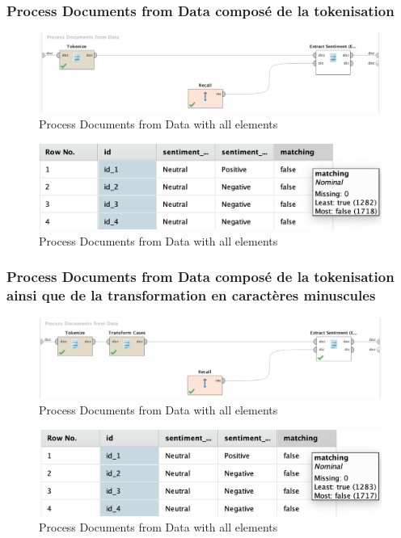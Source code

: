 \documentclass[a4paper]{article}
\begin{document}
\subsubsection{Process Documents from Data composé de la tokenisation}
\begin{figure}[H]
	\includegraphics[width=\linewidth]{imgs/part_3/3_processing_documents_no_stem_filter_token_stopword_transform}
	\caption{Process Documents from Data with all elements}
	\label{fig:3_processing_documents_full}
\end{figure}
\begin{figure}[H]
	\includegraphics[width=\linewidth]{imgs/part_3/3_processing_documents_no_stem_filter_token_stopword_transform_results}
	\caption{Process Documents from Data with all elements}
	\label{fig:3_processing_documents_full}
\end{figure}


\subsubsection{Process Documents from Data composé de la tokenisation ainsi que de la transformation en caractères minuscules}
\begin{figure}[H]
	\includegraphics[width=\linewidth]{imgs/part_3/3_processing_documents_no_stem_filter_token_stopword}
	\caption{Process Documents from Data with all elements}
	\label{fig:3_processing_documents_full}
\end{figure}
\begin{figure}[H]
	\includegraphics[width=\linewidth]{imgs/part_3/3_processing_documents_no_stem_filter_token_stopword_results}
	\caption{Process Documents from Data with all elements}
	\label{fig:3_processing_documents_full}
\end{figure}
\end{document}

